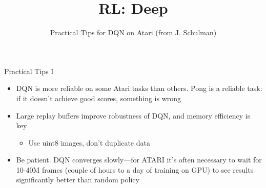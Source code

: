 


\title[RL: Deep Reinforcement Learning]{RL: Deep}
\subtitle{Practical Tips for DQN on Atari (from J. Schulman)}




	
	\maketitle

\begin{frame}[c]{Practical Tips I}
	
	\begin{itemize}
		\item DQN is more reliable on some Atari tasks than others. Pong is a
		reliable task: if it doesn’t achieve good scores, something is wrong
		\item Large replay buffers improve robustness of DQN, and memory
		efficiency is key
		\begin{itemize}
			\item Use uint8 images, don’t duplicate data
		\end{itemize}
		\item Be patient. DQN converges slowly—for ATARI it’s often necessary to
		wait for 10-40M frames (couple of hours to a day of training on GPU)
		to see results significantly better than random policy
	\end{itemize}
	
\end{frame}
